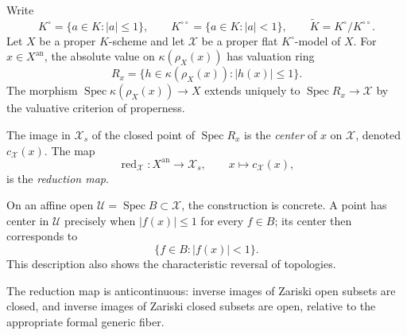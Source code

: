 Write
\[
 K^\circ=\{a\in K:|a|\leq1\},\qquad
 K^{\circ\circ}=\{a\in K:|a|<1\},\qquad
 \widetilde K=K^\circ/K^{\circ\circ}.
\]
Let $X$ be a proper $K$-scheme and let $\mathcal X$ be a proper flat
$K^\circ$-model of $X$. For $x\in X^{\mathrm{an}}$, the absolute value
on $\kappa(\rho_X(x))$ has valuation ring
\[
 R_x=\{h\in\kappa(\rho_X(x)):|h(x)|\leq1\}.
\]
The morphism $\operatorname{Spec}\kappa(\rho_X(x))\to X$ extends uniquely
to $\operatorname{Spec}R_x\to\mathcal X$ by the valuative criterion of
properness.

\begin{definition}\label{def:berk-center-reduction}
The image in $\mathcal X_s$ of the closed point of
$\operatorname{Spec}R_x$ is the \emph{center} of $x$ on $\mathcal X$,
denoted $c_{\mathcal X}(x)$. The map
\[
             \operatorname{red}_{\mathcal X}:X^{\mathrm{an}}
             \longrightarrow\mathcal X_s,
             \qquad x\longmapsto c_{\mathcal X}(x),
\]
is the \emph{reduction map}.
\end{definition}

On an affine open $\mathcal U=\operatorname{Spec}B\subset\mathcal X$, the
construction is concrete. A point has center in $\mathcal U$ precisely
when $|f(x)|\leq1$ for every $f\in B$; its center then corresponds to
\[
                   \{f\in B:|f(x)|<1\}.
\]
This description also shows the characteristic reversal of topologies.

\begin{proposition}
\label{prop:berk-reduction-anticontinuous}
The reduction map is anticontinuous: inverse images of Zariski open subsets
are closed, and inverse images of Zariski closed subsets are open, relative
to the appropriate formal generic fiber.
\end{proposition}

